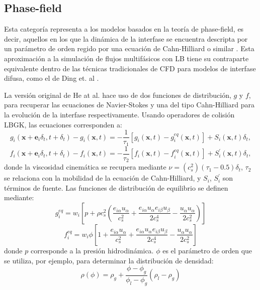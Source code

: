 \subsection*{Phase-field}
Esta categor\'ia representa a los modelos basados en la teor\'ia de phase-field, es decir, aquellos en los que la din\'amica de la interfase se encuentra descripta por un par\'ametro de orden regido por una ecuaci\'on de Cahn-Hilliard o similar \cite{jacqmin_calculation_1999}. Esta aproximaci\'on a la simulaci\'on de flujos multif\'asicos con LB tiene su contraparte equivalente dentro de las t\'ecnicas tradicionales de CFD para modelos de interfase difusa, como el de Ding et. al \cite{ding_diffuse_2007}.

La versi\'on original de He at al. \cite{he_lattice_1999} hace uso de dos funciones de distribuci\'on, $g$ y $f$, para recuperar las ecuaciones de Navier-Stokes y una del tipo Cahn-Hilliard para la evoluci\'on de la interfase respectivamente. Usando operadores de colisi\'on LBGK, las ecuaciones corresponden a:
\begin{equation}
	g_i(\bm{x}+\bm{e}_i\delta_t,t+\delta_t) - g_i(\bm{x},t) = -\dfrac{1}{\tau_1}\left[ g_i(\bm{x},t) - g_i^{eq}(\bm{x},t) \right] + S_i(\bm{x},t)\delta_t,
	\label{eq:he_g_eq}
\end{equation}
\begin{equation}
	f_i(\bm{x}+\bm{e}_i\delta_t,t+\delta_t) - f_i(\bm{x},t) = -\dfrac{1}{\tau_2}\left[ f_i(\bm{x},t) - f_i^{eq}(\bm{x},t) \right] + S_i^{'}(\bm{x},t)\delta_t,
\end{equation}
donde la viscosidad cinem\'atica se recupera mediante $\nu=(c_s^2)(\tau_1-0.5)\delta_t$, $\tau_2$ se relaciona con la mobilidad de la ecuaci\'on de Cahn-Hilliard, y $S_i$, $S_i^{'}$ son t\'erminos de fuente. Las funciones de distribuci\'on de equilibrio se definen mediante:
\begin{equation}
	g_i^{eq} = w_i\left[ p + \rho c_s^2 \left( \dfrac{e_{i\alpha}u_{\alpha}}{c_s^2}  + \dfrac{e_{i\alpha}u_{\alpha}e_{i\beta}u_{\beta}}{2c_s^4} - \dfrac{u_{\alpha}u_{\alpha}}{2c_s^2} \right)  \right]
\end{equation}
\begin{equation}
	f_i^{eq} = w_i \phi \left[ 1 +  \dfrac{e_{i\alpha}u_{\alpha}}{c_s^2}  + \dfrac{e_{i\alpha}u_{\alpha}e_{i\beta}u_{\beta}}{2c_s^4} - \dfrac{u_{\alpha}u_{\alpha}}{2c_s^2}  \right]
\end{equation}
donde $p$ corresponde a la presi\'on hidrodin\'amica. $\phi$ es el par\'ametro de orden que se utiliza, por ejemplo, para determinar la distribuci\'on de densidad:
\begin{equation}
	\rho(\phi) = \rho_g + \dfrac{\phi - \phi_g}{\phi_l - \phi_g}(\rho_l - \rho_g)
\end{equation}

